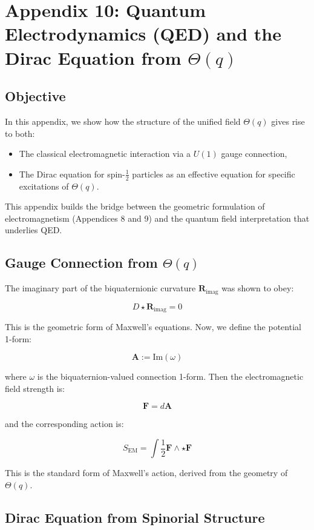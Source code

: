 
\section*{Appendix 10: Quantum Electrodynamics (QED) and the Dirac Equation from \(\Theta(q)\)}

\subsection*{Objective}

In this appendix, we show how the structure of the unified field \(\Theta(q)\) gives rise to both:
\begin{itemize}
  \item The classical electromagnetic interaction via a \(U(1)\) gauge connection,
  \item The Dirac equation for spin-\(\frac{1}{2}\) particles as an effective equation for specific excitations of \(\Theta(q)\).
\end{itemize}

This appendix builds the bridge between the geometric formulation of electromagnetism (Appendices 8 and 9)
and the quantum field interpretation that underlies QED.

\subsection*{Gauge Connection from \(\Theta(q)\)}

The imaginary part of the biquaternionic curvature \(\mathbf{R}_{\text{imag}}\) was shown to obey:

\[
D \star \mathbf{R}_{\text{imag}} = 0
\]

This is the geometric form of Maxwell's equations. Now, we define the potential 1-form:

\[
\mathbf{A} := \text{Im}(\omega)
\]

where \(\omega\) is the biquaternion-valued connection 1-form. Then the electromagnetic field strength is:

\[
\mathbf{F} = d\mathbf{A}
\]

and the corresponding action is:

\[
S_{\text{EM}} = \int \frac{1}{2} \mathbf{F} \wedge \star \mathbf{F}
\]

This is the standard form of Maxwell's action, derived from the geometry of \(\Theta(q)\).

\subsection*{Dirac Equation from Spinorial Structure}

